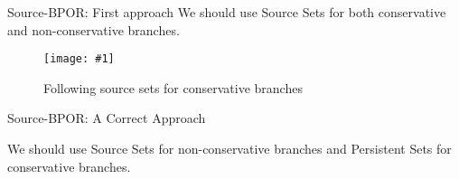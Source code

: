 \documentclass[9pt]{beamer}
\newcommand{\trace}[2]{
\begin{figure}[H]
\centering
\texttt{[image: \#1]}
\caption{#2}
\label{#2}
\end{figure}
}
\begin{document}
\begin{frame}{Source-BPOR: First approach}
We should use Source Sets for both conservative and non-conservative branches.

\trace{../img/w2rsourceconservative.pdf}{Following source sets for conservative branches}
    
\end{frame}

\begin{frame}{Source-BPOR: A Correct Approach}
    
We should use Source Sets for non-conservative branches and Persistent Sets for conservative branches.
\end{frame}

\iffalse
\begin{frame}{Source-BPOR}

\begin{figure}
\scalebox{0.6}{

\begin{algorithm}[H]
    \SetKwInOut{Input}{input}
    \SetKwHangingKw{Let}{let}
    \SetKwProg{Fn}{Function}{}{}
    \caption{Source-BPOR}
    \label{SBPOR}
    \SetKwInOut{Input}{input}
    \SetKwHangingKw{Let}{let}
    Explore($\langle \rangle$,$\emptyset$,$b$)\;
    \Fn{Explore($E$,$Sleep$,$b$)}{
        \If{$\exists p \in ((enabled(s_{[E]}) \backslash Sleep)$ and $B_v(E.p) <=b$}{
            backtrack(E) $:={p}$ \;
            \While{$\exists p \in (backtrack(E) \backslash Sleep $ and $B_v(E.p) <=b$}{
                \ForEach{$e \in dom(E)$ such that $e \lesssim_{E.p} next_{[E]}(p)$}{
                    \Let{$E' = pre(E,e)$}
                    \Let{$u = notdep(e,E).p$}
                    \If{$I_{E'}(u) \cap backtrack(E') = \emptyset$}{
                        add some $q' \in I_{[E']}(u) \text{ to } backtrack(E') $ \;
                    }
                    \Let{$E''= pre\_block(e,E)$}
                    \Let{$u = notdep(e,E).p$}
                    \Let{$CI = \{ i \in I_{E''}(u) \mid i \rightarrow p \}$}
                    \If{$CI \cap backtrack(E') = \emptyset$}{
                        \If{$CI \neq \emptyset$}{
                            add some $q' \in CI$ to $backtrack(E') $ \;
                        }
                        \Else{
                            add some $c(q') \in I_{[E'']}(u)$ to $backtrack(E'') $ \;
                        }
                    } 
                }
                \Let{ $Sleep' := \{q \in Sleep \mid E \models p \diamondsuit q \}$ } 
                $Explore(E.p, Sleep)$ \;
                \If{$p$ is not conservative}{
                    add $p$ to $Sleep$ \;
                }
            }
        }
    }
\end{algorithm}
}
\end{figure}

\end{frame}
\fi
\end{document}
